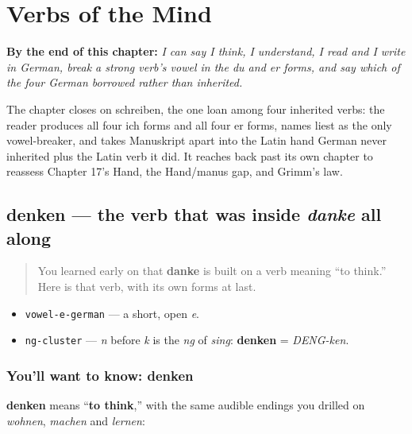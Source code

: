 
\chapter{Verbs of the Mind}
\label{ch:ge-mind-verbs}

\begin{chapteropening}
\textbf{By the end of this chapter:} \emph{I can say I think, I understand, I read and I write in German, break a strong verb's vowel in the du and er forms, and say which of the four German borrowed rather than inherited.}

The chapter closes on schreiben, the one loan among four inherited verbs: the reader produces all four ich forms and all four er forms, names liest as the only vowel-breaker, and takes Manuskript apart into the Latin hand German never inherited plus the Latin verb it did. It reaches back past its own chapter to reassess Chapter 17's Hand, the Hand/manus gap, and Grimm's law.
\end{chapteropening}

\section[denken]{denken — the verb that was inside \emph{danke} all along}

\label{lesson:GE-C24-denken}



\begin{quote}
You learned early on that \textbf{danke} is built on a verb meaning \textquotedblleft{}to think.\textquotedblright{} Here is that verb, with its own forms at last.
\end{quote}

\begin{sounds}
\begin{itemize}
\raggedright
  \item \texttt{vowel-e-german} — a short, open \emph{e}.
  \item \texttt{ng-cluster} — \emph{n} before \emph{k} is the \emph{ng} of \emph{sing}: \textbf{denken} = \emph{DENG-ken}.
\end{itemize}
\end{sounds}

\subsection*{You'll want to know: denken}
\textbf{denken} means \textquotedblleft{}\textbf{to think},\textquotedblright{} with the same audible endings you drilled on \emph{wohnen}, \emph{machen} and \emph{lernen}:

